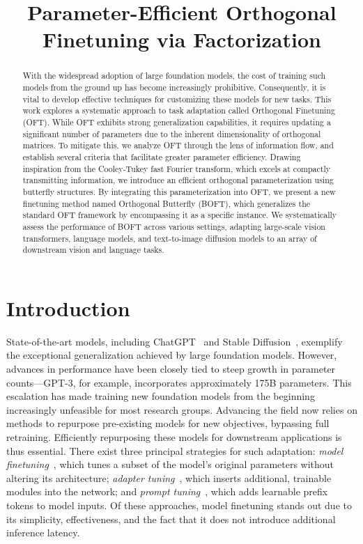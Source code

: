\title{Parameter-Efficient Orthogonal Finetuning via Factorization}

\begin{abstract}
With the widespread adoption of large foundation models, the cost of training such models from the ground up has become increasingly prohibitive. Consequently, it is vital to develop effective techniques for customizing these models for new tasks. This work explores a systematic approach to task adaptation called Orthogonal Finetuning (OFT). While OFT exhibits strong generalization capabilities, it requires updating a significant number of parameters due to the inherent dimensionality of orthogonal matrices. To mitigate this, we analyze OFT through the lens of information flow, and establish several criteria that facilitate greater parameter efficiency. Drawing inspiration from the Cooley-Tukey fast Fourier transform, which excels at compactly transmitting information, we introduce an efficient orthogonal parameterization using butterfly structures. By integrating this parameterization into OFT, we present a new finetuning method named Orthogonal Butterfly (BOFT), which generalizes the standard OFT framework by encompassing it as a specific instance. We systematically assess the performance of BOFT across various settings, adapting large-scale vision transformers, language models, and text-to-image diffusion models to an array of downstream vision and language tasks.
\end{abstract}

\section{Introduction}

State-of-the-art models, including ChatGPT~\cite{brown2020language,chen2021evaluating} and Stable Diffusion~\cite{rombach2022high}, exemplify the exceptional generalization achieved by large foundation models. However, advances in performance have been closely tied to steep growth in parameter counts—GPT-3, for example, incorporates approximately 175B parameters. This escalation has made training new foundation models from the beginning increasingly unfeasible for most research groups. Advancing the field now relies on methods to repurpose pre-existing models for new objectives, bypassing full retraining. Efficiently repurposing these models for downstream applications is thus essential. There exist three principal strategies for such adaptation: \emph{model finetuning}~\cite{hulora2022,zaken2022bitfit,guo2020parameter,raffel2020exploring,qiu2023controlling,zhang2022adaptive,chavan2023one}, which tunes a subset of the model's original parameters without altering its architecture; \emph{adapter tuning}~\cite{rebuffi2017learning,houlsby2019parameter,pfeiffer2020adapterfusion,lin2020exploring,he2021towards}, which inserts additional, trainable modules into the network; and \emph{prompt tuning}~\cite{li2021prefix,lester2021power}, which adds learnable prefix tokens to model inputs. Of these approaches, model finetuning stands out due to its simplicity, effectiveness, and the fact that it does not introduce additional inference latency.

